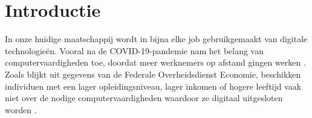 
\section{Introductie}%
\label{sec:introductie}








In onze huidige maatschappij wordt in bijna elke job gebruikgemaakt van digitale technologieën. Vooral na de COVID-19-pandemie nam het belang van computervaardigheden toe, doordat meer werknemers op afstand gingen werken \autocite{NBERw27422}. Zoals blijkt uit gegevens van de Federale Overheidsdienst Economie, beschikken individuen met een lager opleidingsniveau, lager inkomen of hogere leeftijd vaak niet over de nodige computervaardigheden waardoor ze digitaal uitgesloten worden \autocite{FederalPublicServiceEconomyKloof}.

